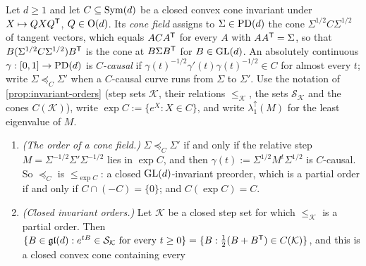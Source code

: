 \begin{theorem}
\label{thm:cone-orders}
\leanok
Let $d \ge 1$ and let $C \subseteq \mathrm{Sym}(d)$ be a closed convex cone invariant under $X \mapsto QXQ^{\mathsf{T}}$,
$Q \in \mathrm{O}(d)$. Its \emph{cone field} assigns to $\Sigma \in \mathrm{PD}(d)$ the cone
$\Sigma^{1/2}C\Sigma^{1/2}$ of tangent vectors, which equals $ACA^{\mathsf{T}}$ for every $A$ with
$AA^{\mathsf{T}} = \Sigma$, so that $B(\Sigma^{1/2}C\Sigma^{1/2})B^{\mathsf{T}}$ is the cone at $B\Sigma B^{\mathsf{T}}$ for
$B \in \mathrm{GL}(d)$. An absolutely continuous $\gamma : [0,1] \to \mathrm{PD}(d)$ is \emph{$C$-causal} if
$\gamma(t)^{-1/2}\gamma'(t)\gamma(t)^{-1/2} \in C$ for almost every $t$; write $\Sigma \preceq_C \Sigma'$
when a $C$-causal curve runs from $\Sigma$ to $\Sigma'$. Use the notation of \ref{prop:invariant-orders}
(step sets $\mathcal K$, their relations $\le_{\mathcal K}$, the sets $\mathcal S_{\mathcal K}$ and the cones
$C(\mathcal K)$), write $\exp C := \{e^X : X \in C\}$, and write $\lambda^\uparrow_1(M)$ for the least
eigenvalue of $M$.
\begin{enumerate}
\item \emph{(The order of a cone field.)} $\Sigma \preceq_C \Sigma'$ if and only if the relative step
$M = \Sigma^{-1/2}\Sigma'\Sigma^{-1/2}$ lies in $\exp C$, and then $\gamma(t) := \Sigma^{1/2}M^t\Sigma^{1/2}$
is $C$-causal. So $\preceq_C$ is $\le_{\exp C}$: a closed $\mathrm{GL}(d)$-invariant preorder, which is a partial
order if and only if $C \cap (-C) = \{0\}$; and $C(\exp C) = C$.
\item \emph{(Closed invariant orders.)} Let $\mathcal K$ be a closed step set for which $\le_{\mathcal K}$
is a partial order. Then
$\{B \in \mathfrak{gl}(d) : e^{tB} \in \mathcal S_{\mathcal K} \text{ for every } t \ge 0\} =
\{B : \tfrac12(B + B^{\mathsf{T}}) \in C(\mathcal K)\}$, and this is a closed convex cone containing every

\end{enumerate}
\end{theorem}

